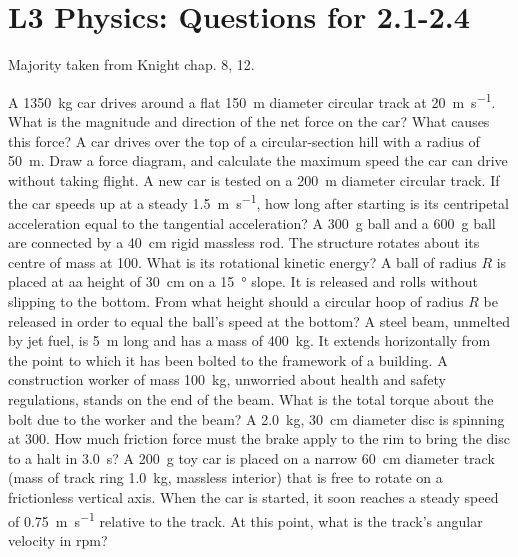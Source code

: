 \documentclass[a4paper]{exam}
\begin{document}
  \section*{L3 Physics: Questions for 2.1-2.4}
  Majority taken from Knight chap. 8, 12.
  \begin{questions}
    \question A \SI{1350}{\kilo\gram} car drives around a flat \SI{150}{\metre} diameter circular track at \SI{20}{\metre\per\second}.
              What is the magnitude and direction of the net force on the car? What causes this force?
    \question A car drives over the top of a circular-section hill with a radius of \SI{50}{\metre}. Draw a force diagram, and calculate
              the maximum speed the car can drive without taking flight.
    \question A new car is tested on a \SI{200}{\metre} diameter circular track. If the car speeds up at a steady \SI{1.5}{\metre\per\second},
              how long after starting is its centripetal acceleration equal to the tangential acceleration?
    \question A \SI{300}{\gram} ball and a \SI{600}{\gram} ball are connected by a \SI{40}{\centi\metre} rigid massless rod. The structure rotates
              about its centre of mass at \SI{100}{\rpm}. What is its rotational kinetic energy?
    \question A ball of radius $ R $ is placed at aa height of \SI{30}{\centi\metre} on a \SI{15}{\degree} slope. It is released and rolls
              without slipping to the bottom. From what height should a circular hoop of radius $ R $ be released in order to equal the
              ball's speed at the bottom?
    \question A steel beam, unmelted by jet fuel, is \SI{5}{\metre} long and has a mass of \SI{400}{\kilo\gram}. It extends horizontally
              from the point to which it has been bolted to the framework of a building. A construction worker of mass \SI{100}{\kg}, unworried
              about health and safety regulations, stands on the end of the beam. What is the total torque about the bolt due to the worker
              and the beam?
    \question A \SI{2.0}{\kilo\gram}, \SI{30}{\centi\metre} diameter disc is spinning at \SI{300}{\rpm}. How much friction force must the brake
              apply to the rim to bring the disc to a halt in \SI{3.0}{\second}?
    \question A \SI{200}{\gram} toy car is placed on a narrow \SI{60}{\centi\metre} diameter track (mass of track ring \SI{1.0}{\kilo\gram},
              massless interior) that is free to rotate on a frictionless vertical axis. When the car is started, it soon reaches a steady
              speed of \SI{0.75}{\metre\per\second} relative to the track. At this point, what is the track's angular velocity in rpm?

\end{questions}
\end{document}
